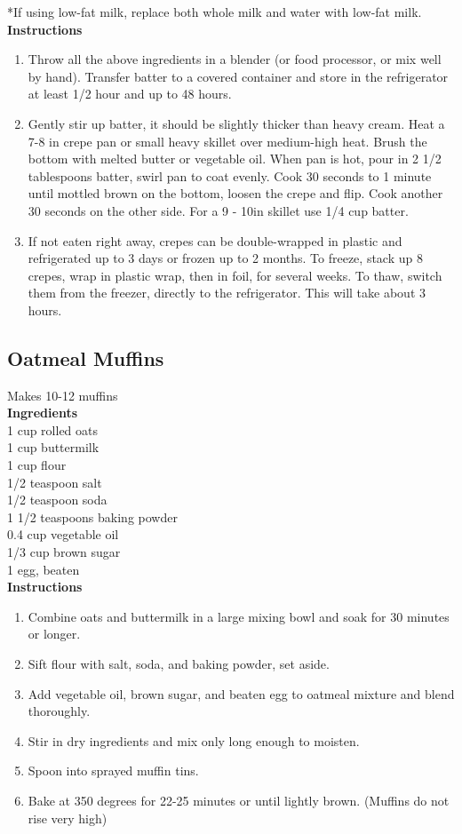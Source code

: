 \documentclass{article}
\numberwithin{figure}{section}
\numberwithin{equation}{section}
\begin{document}
*If using low-fat milk, replace both whole milk and water with low-fat milk.\\

{\bf Instructions}
\begin{enumerate}
\item Throw all the above ingredients in a blender (or food processor, or mix well by hand).  Transfer batter to a covered container and store in the refrigerator at least 1/2 hour and up to 48 hours.
\item Gently stir up batter, it should be slightly thicker than heavy cream.  Heat a 7-8 in crepe pan or small heavy skillet over medium-high heat.  Brush the bottom with melted butter or vegetable oil.  When pan is hot, pour in 2 1/2 tablespoons batter, swirl pan to coat evenly.  Cook 30 seconds to 1 minute until mottled brown on the bottom, loosen the crepe and flip.  Cook another 30 seconds on the other side.  For a 9 - 10in skillet use 1/4 cup batter.
\item If not eaten right away, crepes can be double-wrapped in plastic and refrigerated up to 3 days or frozen up to 2 months.  To freeze, stack up 8 crepes, wrap in plastic wrap, then in foil, for several weeks.  To thaw, switch them from the freezer, directly to the refrigerator.  This will take about 3 hours.
\end{enumerate}

\pagebreak
\subsection{Oatmeal Muffins}
Makes 10-12 muffins\\

{\bf Ingredients}\\
1 cup rolled oats\\
1 cup buttermilk\\
1 cup flour\\
1/2 teaspoon salt\\
1/2 teaspoon soda\\
1 1/2 teaspoons baking powder\\
0.4 cup vegetable oil\\
1/3 cup brown sugar\\
1 egg, beaten\\

{\bf Instructions}
\begin{enumerate}
\item Combine oats and buttermilk in a large mixing bowl and soak for 30 minutes or longer.
\item Sift flour with salt, soda, and baking powder, set aside.  
\item Add vegetable oil, brown sugar, and beaten egg to oatmeal mixture and blend thoroughly.
\item Stir in dry ingredients and mix only long enough to moisten.
\item Spoon into sprayed muffin tins.
\item Bake at 350 degrees for 22-25 minutes or until lightly brown. (Muffins do  not rise very high)
\end{enumerate}
\end{document}
